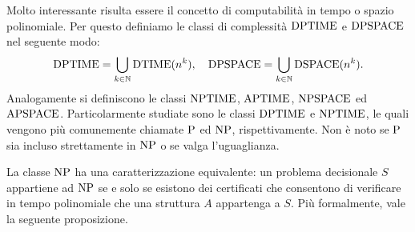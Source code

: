 % 
% 

Molto interessante risulta essere il concetto di computabilità in tempo o spazio polinomiale.
Per questo definiamo le classi di complessità $\DPTIME$ e $\DPSPACE$ nel seguente modo:
\[ \DPTIME = \bigcup_{k\in\N} \DTIME(n^k), \quad \DPSPACE = \bigcup_{k\in\N} \DSPACE(n^k). \]
Analogamente si definiscono le classi $\NPTIME$, $\APTIME$, $\NPSPACE$ ed $\APSPACE$.
Particolarmente studiate sono le classi $\DPTIME$ e $\NPTIME$, le quali vengono più comunemente chiamate $\P$ ed $\NP$, rispettivamente.
Non è noto se $\P$ sia incluso strettamente in $\NP$ o se valga l'uguaglianza.

La classe $\NP$ ha una caratterizzazione equivalente: un problema decisionale $S$ appartiene ad $\NP$ se e solo se esistono dei certificati che consentono di verificare in tempo polinomiale che una struttura $A$ appartenga a $S$.
Più formalmente, vale la seguente proposizione.

